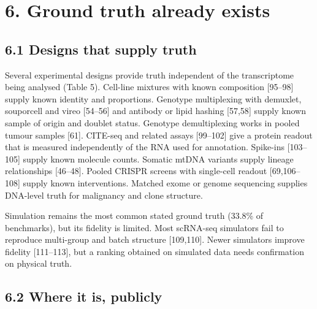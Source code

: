 \documentclass[11pt]{article}
\begin{document}
\section{6. Ground truth already exists}\label{ground-truth-already-exists}

\subsection{6.1 Designs that supply truth}\label{designs-that-supply-truth}

Several experimental designs provide truth independent of the
transcriptome being analysed (Table 5). Cell-line mixtures with known
composition {[}95--98{]} supply known identity and proportions. Genotype
multiplexing with demuxlet, souporcell and vireo {[}54--56{]} and
antibody or lipid hashing {[}57,58{]} supply known sample of origin and
doublet status. Genotype demultiplexing works in pooled tumour samples
{[}61{]}. CITE-seq and related assays {[}99--102{]} give a protein
readout that is measured independently of the RNA used for annotation.
Spike-ins {[}103--105{]} supply known molecule counts. Somatic mtDNA
variants supply lineage relationships {[}46--48{]}. Pooled CRISPR
screens with single-cell readout {[}69,106--108{]} supply known
interventions. Matched exome or genome sequencing supplies DNA-level
truth for malignancy and clone structure.

Simulation remains the most common stated ground truth (33.8\% of
benchmarks), but its fidelity is limited. Most scRNA-seq simulators fail
to reproduce multi-group and batch structure {[}109,110{]}. Newer
simulators improve fidelity {[}111--113{]}, but a ranking obtained on
simulated data needs confirmation on physical truth.

\subsection{6.2 Where it is, publicly}\label{where-it-is-publicly}
\end{document}
